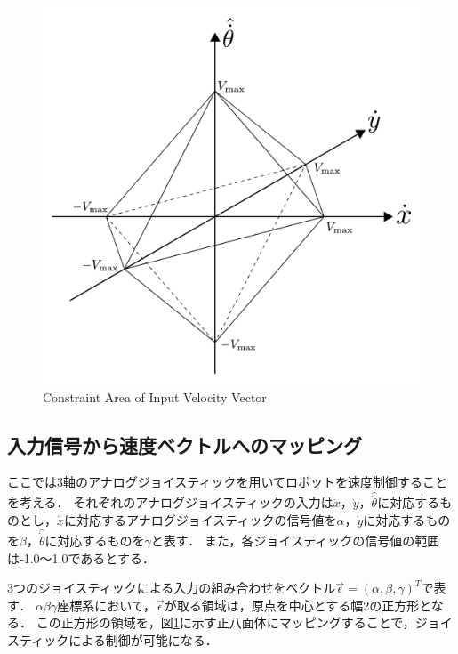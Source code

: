 \begin{figure}[h]
  \centering
  \includegraphics[width=80truemm, clip]{images/constraint.pdf}
  \caption{Constraint Area of Input Velocity Vector}
  \label{fig:constraint}
\end{figure}

\subsection{入力信号から速度ベクトルへのマッピング}

ここでは3軸のアナログジョイスティックを用いてロボットを速度制御することを考える．
それぞれのアナログジョイスティックの入力は$\dot{x}$，$\dot{y}$，$\hat{\dot{\theta}}$に対応するものとし，$\dot{x}$に対応するアナログジョイスティックの信号値を$\alpha$，$\dot{y}$に対応するものを$\beta$，$\hat{\dot{\theta}}$に対応するものを$\gamma$と表す．
また，各ジョイスティックの信号値の範囲は-1.0～1.0であるとする．

3つのジョイスティックによる入力の組み合わせをベクトル$\vec{\epsilon} = (\alpha, \beta, \gamma)^T$で表す．
$\alpha\beta\gamma$座標系において，$\vec{\epsilon}$が取る領域は，原点を中心とする幅2の正方形となる．
この正方形の領域を，図\ref{fig:constraint}に示す正八面体にマッピングすることで，ジョイスティックによる制御が可能になる．


